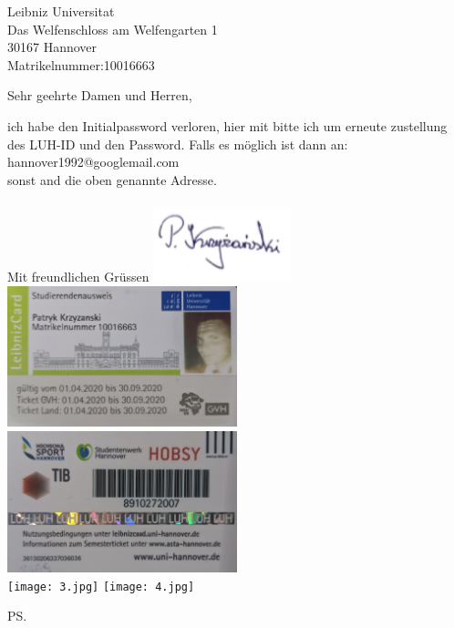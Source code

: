 \documentclass{letter}
\begin{document}
\begin{letter}{Leibniz Universitat \\Das Welfenschloss am Welfengarten 1\\30167 Hannover\\Matrikelnummer:10016663\\}
\opening{Sehr geehrte Damen und Herren, }
ich habe den Initialpassword verloren, 
hier mit bitte ich um erneute zustellung des LUH-ID und den Password.
Falls es m\"oglich ist dann an:\\
hannover1992@googlemail.com\\
sonst and die oben genannte Adresse. 
\\\\


Mit freundlichen Gr\"ussen
\includegraphics[width=0.3\textwidth]{0.png}
\newpage
\includegraphics[width=0.5\textwidth]{1.jpg}
\includegraphics[width=0.5\textwidth]{2.jpg}\\
\texttt{[image: 3.jpg]}
\texttt{[image: 4.jpg]}

\ps


\end{letter}
\end{document}
